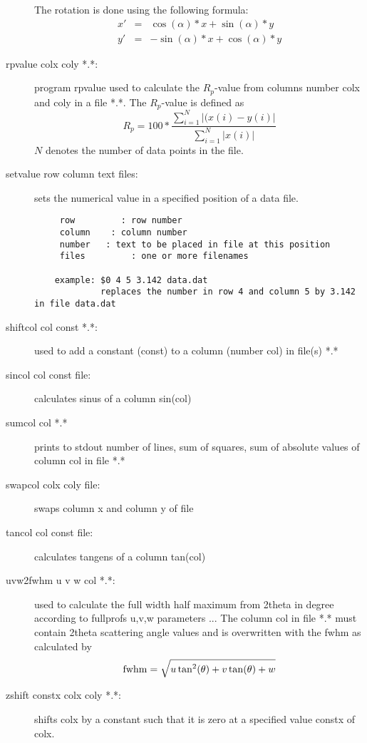 \begin{description}
 The rotation is done using the following formula:
\begin{eqnarray}
 x'&= &\cos(\alpha)*x+\sin(\alpha)*y \nonumber \\
 y'&=&-\sin(\alpha)*x+\cos(\alpha)*y
\end{eqnarray}
\item [\prg rpvalue\index{rpvalue} colx coly  *.*:]  program rpvalue  used to %
calculate 
                       the $R_p$-value from columns number colx and coly 
		       in a file *.*. The $R_p$-value is defined as
		       \begin{equation}
		       R_p= 100*\frac{\sum_{i=1}^{N} |(x(i)-y(i)|}{\sum_{i=1}^{N}|x(i)|}
		       \end{equation}
                       $N$ denotes the number of data points in the file.
\item [\prg setvalue\index{setvalue} row column text files:] sets the numerical value in a specified position of a data file.

\begin{verbatim}
     row         : row number
     column    : column number
     number   : text to be placed in file at this position
     files         : one or more filenames

    example: $0 4 5 3.142 data.dat
             replaces the number in row 4 and column 5 by 3.142 in file data.dat
\end{verbatim}
\item [\prg shiftcol\index{shiftcol} col const *.*:] used to add a constant (const) to a column %
(number col) in file(s) *.*
\item [\prg sincol\index{sincol} col const file:] calculates sinus of a column sin(col) 
\item [\prg sumcol\index{sumcol} col *.*] prints to stdout number of lines, sum of squares, sum %
of absolute values of column col in file *.*
\item [\prg swapcol\index{swapcol} colx coly file:] swaps column x and column y of file
\item [\prg tancol\index{tanncol} col const file:] calculates tangens of a column tan(col) 
\item [\prg uvw2fwhm\index{uvw2fwhm} u v w col *.*:] used to calculate the full
                   width half maximum from
                   2theta in degree according to fullprofs u,v,w parameters ...
                  The column col in file *.* must contain 2theta scattering angle
                 values and is overwritten with the fwhm as calculated by
                  \begin{equation}
                     {\rm  fwhm }= \sqrt {u \tan^2(\theta) + v \tan(\theta) + w}
                \end{equation}
\item [\prg zshift\index{zshift} constx colx coly *.*:] shifts colx by a constant such that it %
is zero at a specified value constx of colx. 
\end{description}

